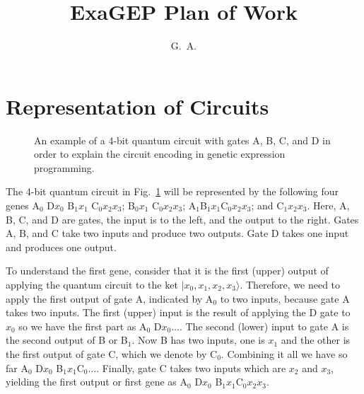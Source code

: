 \documentclass{article}
\begin{document}
	
\title{ExaGEP Plan of Work}

\author{G.~A.}

\maketitle

\section{Representation of Circuits}

\begin{figure}[h]
	\caption{\label{fig:circuit}
		An example of a 4-bit quantum circuit with gates A, B, C, and D in order
		to explain the circuit encoding in genetic expression programming.}
\end{figure}

The 4-bit quantum circuit in Fig.~\ref{fig:circuit} will be represented
by the following four genes A$_0$ D$x_0$  B$_1x_1$ C$_0x_2x_3$;
 B$_0x_1$ C$_0x_2x_3$; A$_1$B$_1x_1$C$_0x_2 x_3$; and C$_1x_2x_3$.
Here, A, B, C, and D are gates, the input is to the left, and the output to the right.
Gates A, B, and C take two inputs and produce two outputs. Gate D takes one input and produces one output.

To understand the first gene, consider that it is the first (upper) output of applying
the quantum circuit to the ket $|x_0, x_1, x_2, x_3\rangle$. Therefore, we need
to apply the first output of gate A, indicated by A$_0$ to two inputs, because
gate A takes two inputs. The first (upper) input is the result of applying the D gate
to $x_0$ so we have the first part as A$_0$ D$x_0\ldots$. The second (lower) input to gate
A is the second output of B or B$_1$. Now B has two inputs, one is $x_1$ and the other is
the first output of gate C, which we denote by C$_0$. Combining it all we have so far
A$_0$ D$x_0$ B$_1x_1$C$_0\ldots$. Finally, gate C takes two inputs which are $x_2$ and $x_3$,
yielding the first output or first gene as A$_0$ D$x_0$ B$_1x_1$C$_0x_2x_3$.
\end{document}
